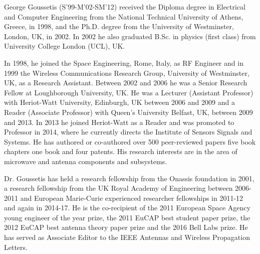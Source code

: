 \documentclass[journal]{IEEEtran}
\begin{document}
\begin{IEEEbiography}
{George Goussetis} (S'99-M'02-SM'12) received the Diploma degree in Electrical and Computer Engineering from the National Technical University of Athens, Greece, in 1998, and the Ph.D. degree from the University of Westminster, London, UK, in 2002. In 2002 he also graduated B.Sc. in physics (first class) from University College London (UCL), UK. 

In 1998, he joined the Space Engineering, Rome, Italy, as RF Engineer and in 1999 the Wireless Communications Research Group, University of Westminster, UK, as a Research Assistant. Between 2002 and 2006 he was a Senior Research Fellow at Loughborough University, UK. He was a Lecturer (Assistant Professor) with Heriot-Watt University, Edinburgh, UK between 2006 and 2009 and a Reader (Associate Professor) with Queen’s University Belfast, UK, between 2009 and 2013. In 2013 he joined Heriot-Watt as a Reader and was promoted to Professor in 2014, where he currently directs the Institute of Sensors Signals and Systems. He has authored or co-authored over 500 peer-reviewed papers five book chapters one book and four patents. His research interests are in the area of microwave and antenna components and subsystems. 

Dr. Goussetis has held a research fellowship from the Onassis foundation in 2001, a research fellowship from the UK Royal Academy of Engineering between 2006-2011 and European Marie-Curie experienced researcher fellowships in 2011-12 and again in 2014-17. He is the co-recipient of the 2011 European Space Agency young engineer of the year prize, the 2011 EuCAP best student paper prize, the 2012 EuCAP best antenna theory paper prize and the 2016 Bell Labs prize. He has served as Associate Editor to the IEEE Antennas and Wireless Propagation Letters.

\end{IEEEbiography}
\end{document}
